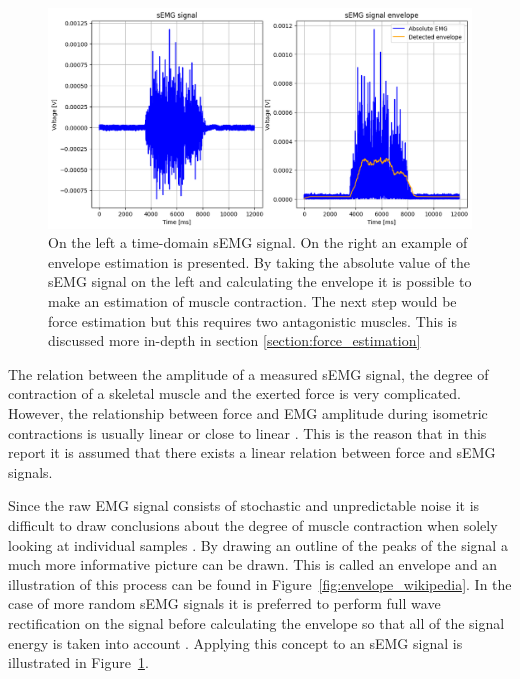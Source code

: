 \begin{figure}[h!t]
	\begin{center}
		\includegraphics[width=1.0\columnwidth]{images/amplitude_force_estimation_example.png}
	\end{center}
	\caption{On the left a time-domain sEMG signal. On the right an example of envelope estimation is presented. By taking the absolute value of the sEMG signal on the left and calculating the envelope it is possible to make an estimation of muscle contraction. The next step would be force estimation but this requires two antagonistic muscles. This is discussed more in-depth in section \ref{section:force_estimation}}
	\label{fig:amplitude_estimation_example}
\end{figure}

The relation between the amplitude of a measured sEMG signal, the degree of contraction of a skeletal muscle and the exerted force is very complicated. However, the relationship between force and EMG amplitude during isometric contractions is usually linear or close to linear  \cite{interpreting_muscle_function_from_emg} \cite{adaptive_filter_dry_electrode}. This is the reason that in this report it is assumed that there exists a linear relation between force and sEMG signals.

Since the raw EMG signal consists of stochastic and unpredictable noise it is difficult to draw conclusions about the degree of muscle contraction when solely looking at individual samples \cite{semg_signals_analysis_and_applications}. By drawing an outline of the peaks of the signal a much more informative picture can be drawn. This is called an envelope and an illustration of this process can be found in Figure~\ref{fig:envelope_wikipedia}. In the case of more random sEMG signals it is preferred to perform full wave rectification on the signal before calculating the envelope so that all of the signal energy is taken into account \cite{semg_signals_analysis_and_applications}. Applying this concept to an sEMG signal is illustrated in Figure~\ref{fig:amplitude_estimation_example}.

